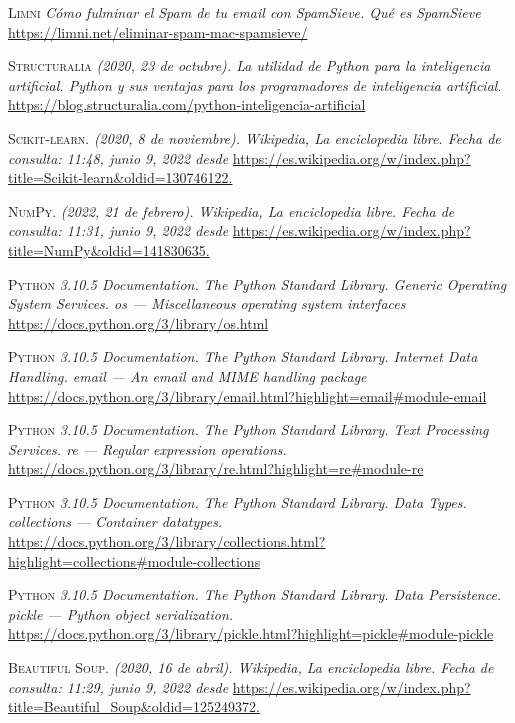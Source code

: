 \documentclass[conference,a4paper]{IEEEtran}
\begin{document}
\begin{thebibliography}{30}
 \textsc{Limni} \textit{Cómo fulminar el Spam de tu email con SpamSieve. Qué es SpamSieve} \url{https://limni.net/eliminar-spam-mac-spamsieve/}



 \textsc{Structuralia} \textit{(2020, 23 de octubre). La utilidad de Python para la inteligencia artificial. Python y sus ventajas para los programadores de inteligencia artificial.} \url{https://blog.structuralia.com/python-inteligencia-artificial}

 \textsc{Scikit-learn.} \textit{(2020, 8 de noviembre). Wikipedia, La enciclopedia libre. Fecha de consulta: 11:48, junio 9, 2022 desde} \url{https://es.wikipedia.org/w/index.php?title=Scikit-learn&oldid=130746122.}

 \textsc{NumPy.} \textit{(2022, 21 de febrero). Wikipedia, La enciclopedia libre. Fecha de consulta: 11:31, junio 9, 2022 desde} \url{https://es.wikipedia.org/w/index.php?title=NumPy&oldid=141830635.}


 \textsc{Python} \textit{ 3.10.5 Documentation. The Python Standard Library. Generic Operating System Services. os — Miscellaneous operating system interfaces } \url{https://docs.python.org/3/library/os.html}


 \textsc{Python} \textit{ 3.10.5 Documentation. The Python Standard Library. Internet Data Handling. email — An email and MIME handling package } \url{https://docs.python.org/3/library/email.html?highlight=email#module-email}


 \textsc{Python} \textit{ 3.10.5 Documentation. The Python Standard Library. Text Processing Services. re — Regular expression operations. } \url{https://docs.python.org/3/library/re.html?highlight=re#module-re}

 \textsc{Python} \textit{ 3.10.5 Documentation. The Python Standard Library. Data Types. collections — Container datatypes. } \url{https://docs.python.org/3/library/collections.html?highlight=collections#module-collections}


 \textsc{Python} \textit{ 3.10.5 Documentation. The Python Standard Library. Data Persistence. pickle — Python object serialization. } \url{https://docs.python.org/3/library/pickle.html?highlight=pickle#module-pickle}


 \textsc{Beautiful Soup.} \textit{(2020, 16 de abril). Wikipedia, La enciclopedia libre. Fecha de consulta: 11:29, junio 9, 2022 desde} \url{https://es.wikipedia.org/w/index.php?title=Beautiful_Soup&oldid=125249372.}


\end{thebibliography}
\end{document}
